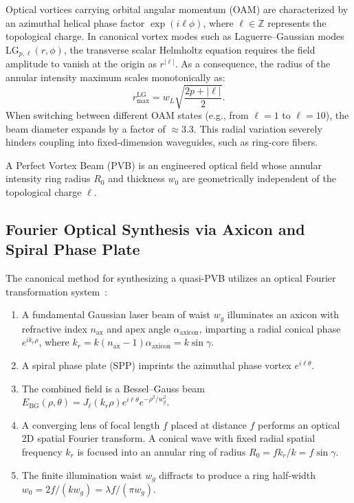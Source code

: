 \documentclass{optica-article}
\begin{document}
Optical vortices carrying orbital angular momentum (OAM) are characterized by an azimuthal helical phase factor $\exp(i \ell \phi)$, where $\ell \in \mathbb{Z}$ represents the topological charge. In canonical vortex modes such as Laguerre--Gaussian modes $\text{LG}_{p, \ell}(r, \phi)$, the transverse scalar Helmholtz equation requires the field amplitude to vanish at the origin as $r^{|\ell|}$. As a consequence, the radius of the annular intensity maximum scales monotonically as:
\begin{equation}
r_{\max}^{\text{LG}} = w_L \sqrt{\frac{2p + |\ell|}{2}}.
\label{eq:app_lg_scaling}
\end{equation}
When switching between different OAM states (e.g., from $\ell=1$ to $\ell=10$), the beam diameter expands by a factor of $\approx 3.3$. This radial variation severely hinders coupling into fixed-dimension waveguides, such as ring-core fibers.

A Perfect Vortex Beam (PVB) is an engineered optical field whose annular intensity ring radius $R_0$ and thickness $w_0$ are geometrically independent of the topological charge $\ell$.

\subsection{Fourier Optical Synthesis via Axicon and Spiral Phase Plate}

The canonical method for synthesizing a quasi-PVB utilizes an optical Fourier transformation system~\cite{Vaity2015}:
\begin{enumerate}
    \item A fundamental Gaussian laser beam of waist $w_g$ illuminates an axicon with refractive index $n_{\text{ax}}$ and apex angle $\alpha_{\text{axicon}}$, imparting a radial conical phase $e^{i k_r \rho}$, where $k_r = k (n_{\text{ax}}-1) \alpha_{\text{axicon}} = k \sin \gamma$.
    \item A spiral phase plate (SPP) imprints the azimuthal phase vortex $e^{i \ell \theta}$.
    \item The combined field is a Bessel--Gauss beam $E_{\text{BG}}(\rho, \theta) = J_\ell(k_r \rho) e^{i \ell \theta} e^{-\rho^2 / w_g^2}$.
    \item A converging lens of focal length $f$ placed at distance $f$ performs an optical 2D spatial Fourier transform. A conical wave with fixed radial spatial frequency $k_r$ is focused into an annular ring of radius $R_0 = f k_r / k = f \sin \gamma$.
    \item The finite illumination waist $w_g$ diffracts to produce a ring half-width $w_0 = 2f / (k w_g) = \lambda f / (\pi w_g)$.
\end{enumerate}
\end{document}
